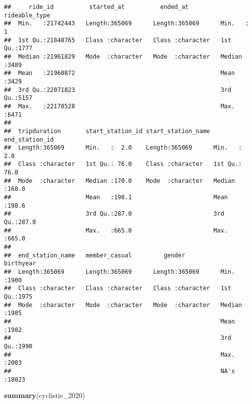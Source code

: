 \documentclass[
]{article}
\newenvironment{Shaded}{\begin{snugshade}}{\end{snugshade}}
\newcommand{\FunctionTok}[1]{\textcolor[rgb]{0.13,0.29,0.53}{\textbf{#1}}}
\newcommand{\NormalTok}[1]{#1}
\begin{document}
\begin{verbatim}
##     ride_id          started_at          ended_at         rideable_type 
##  Min.   :21742443   Length:365069      Length:365069      Min.   :   1  
##  1st Qu.:21848765   Class :character   Class :character   1st Qu.:1777  
##  Median :21961829   Mode  :character   Mode  :character   Median :3489  
##  Mean   :21960872                                         Mean   :3429  
##  3rd Qu.:22071823                                         3rd Qu.:5157  
##  Max.   :22178528                                         Max.   :6471  
##                                                                         
##  tripduration       start_station_id start_station_name end_station_id 
##  Length:365069      Min.   :  2.0    Length:365069      Min.   :  2.0  
##  Class :character   1st Qu.: 76.0    Class :character   1st Qu.: 76.0  
##  Mode  :character   Median :170.0    Mode  :character   Median :168.0  
##                     Mean   :198.1                       Mean   :198.6  
##                     3rd Qu.:287.0                       3rd Qu.:287.0  
##                     Max.   :665.0                       Max.   :665.0  
##                                                                        
##  end_station_name   member_casual         gender            birthyear    
##  Length:365069      Length:365069      Length:365069      Min.   :1900   
##  Class :character   Class :character   Class :character   1st Qu.:1975   
##  Mode  :character   Mode  :character   Mode  :character   Median :1985   
##                                                           Mean   :1982   
##                                                           3rd Qu.:1990   
##                                                           Max.   :2003   
##                                                           NA's   :18023
\end{verbatim}

\begin{Shaded}
\begin{Highlighting}[]
\FunctionTok{summary}\NormalTok{(cyclistic\_2020)}
\end{Highlighting}
\end{Shaded}
\end{document}
